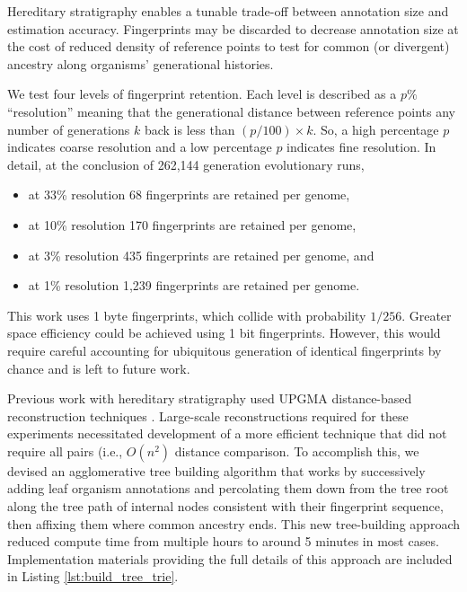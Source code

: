 Hereditary stratigraphy enables a tunable trade-off between annotation size and estimation accuracy.
Fingerprints may be discarded to decrease annotation size at the cost of reduced density of reference points to test for common (or divergent) ancestry along organisms' generational histories.

We test four levels of fingerprint retention.
Each level is described as a $p\%$ ``resolution'' meaning that the generational distance between reference points any number of generations $k$ back is less than $(p / 100) \times k$.
So, a high percentage $p$ indicates coarse resolution and a low percentage $p$ indicates fine resolution.
In detail, at the conclusion of 262,144 generation evolutionary runs,
\begin{itemize}
  \item at 33\% resolution 68 fingerprints are retained per genome,
  \item at 10\% resolution 170 fingerprints are retained per genome,
  \item at 3\% resolution 435 fingerprints are retained per genome, and
  \item at 1\% resolution 1,239 fingerprints are retained per genome.
\end{itemize}

This work uses 1 byte fingerprints, which collide with probability $1/256$.
Greater space efficiency could be achieved using 1 bit fingerprints.
However, this would require careful accounting for ubiquitous generation of identical fingerprints by chance and is left to future work.

Previous work with hereditary stratigraphy used UPGMA distance-based reconstruction techniques \citep{moreno2022hereditary}.
Large-scale reconstructions required for these experiments necessitated development of a more efficient technique that did not require all pairs (i.e., $O(n^2)$ distance comparison.
To accomplish this, we devised an agglomerative tree building algorithm that works by successively adding leaf organism annotations and percolating them down from the tree root along the tree path of internal nodes consistent with their fingerprint sequence, then affixing them where common ancestry ends.
This new tree-building approach reduced compute time from multiple hours to around 5 minutes in most cases.
Implementation materials providing the full details of this approach are included in Listing \ref{lst:build_tree_trie}.



